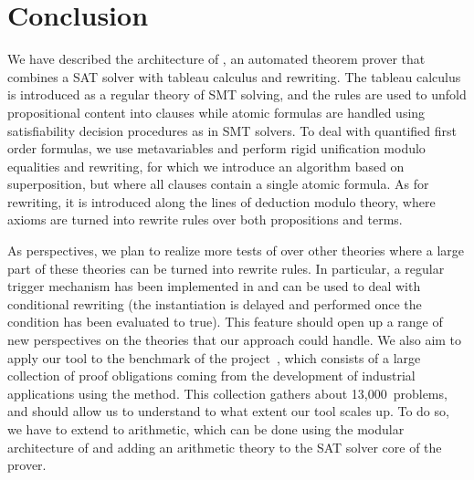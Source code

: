 
\section{Conclusion}

We have described the architecture of \archsat{}, an automated theorem prover
that combines a SAT solver with tableau calculus and rewriting. The tableau
calculus is introduced as a regular theory of SMT solving, and the rules are
used to unfold propositional content into clauses while atomic formulas are
handled using satisfiability decision procedures as in SMT solvers. To deal with
quantified first order formulas, we use metavariables and perform rigid
unification modulo equalities and rewriting, for which we introduce an algorithm
based on superposition, but where all clauses contain a single atomic formula.
As for rewriting, it is introduced along the lines of deduction modulo theory,
where axioms are turned into rewrite rules over both propositions and terms.

As perspectives, we plan to realize more tests of \archsat{} over other theories
where a large part of these theories can be turned into rewrite rules. In
particular, a regular trigger mechanism has been implemented in \archsat{} and
can be used to deal with conditional rewriting (the instantiation is delayed and
performed once the condition has been evaluated to true). This feature should 
open up a range of new perspectives on the theories that our approach could
handle. We also aim to apply our tool to the benchmark of the \bware{}
project~\cite{BWare}, which consists of a large collection of proof obligations
coming from the development of industrial applications using the \bmth{} method.
This collection gathers about 13,000~problems, and should allow us to understand
to what extent our tool scales up. To do so, we have to extend \archsat{} to
arithmetic, which can be done using the modular architecture of \archsat{} and
adding an arithmetic theory to the SAT solver core of the prover.
